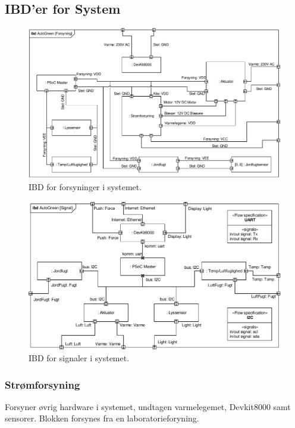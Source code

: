 \clearpage

\subsection{IBD'er for System}

\begin{figure}[!h]
\centering 
\includegraphics[width={\textheight-65 pt}, angle = 90] {../fig/ibd_system_forsyninger.pdf}
\caption{IBD for forsyninger i systemet.}
\label{fig:ibd_system_forsyn}
\end{figure}

\clearpage

\begin{figure}
\centering 
\includegraphics[width={\textheight-25 pt}, angle = 270] {../fig/ibd_system_signaler.pdf}
\caption{IBD for signaler i systemet.}
\label{fig:ibd_system_signal}
\end{figure}

\clearpage

\subsubsection{Strømforsyning}
Forsyner øvrig hardware i systemet, undtagen varmelegemet, Devkit8000 samt sensorer. Blokken forsynes fra en laboratorieforyning.
